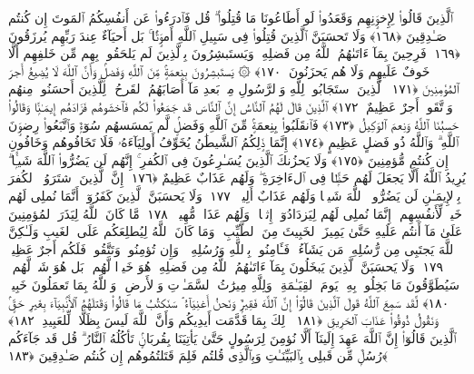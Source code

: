  ٱلَّذِينَ قَالُوا۟ لِإِخوَٟنِهِم وَقَعَدُوا۟ لَو أَطَاعُونَا مَا قُتِلُوا۟ ۗ قُل فَٱدرَءُوا۟ عَن أَنفُسِكُمُ ٱلمَوتَ إِن كُنتُم صَـٰدِقِينَ ﴿١٦٨﴾
 وَلَا تَحسَبَنَّ ٱلَّذِينَ قُتِلُوا۟ فِى سَبِيلِ ٱللَّهِ أَموَٟتًۢا ۚ بَل أَحيَآءٌ عِندَ رَبِّهِم يُرزَقُونَ ﴿١٦٩﴾
 فَرِحِينَ بِمَآ ءَاتَىٰهُمُ ٱللَّهُ مِن فَضلِهِۦ وَيَستَبشِرُونَ بِٱلَّذِينَ لَم يَلحَقُوا۟ بِهِم مِّن خَلفِهِم أَلَّا خَوفٌ عَلَيهِم وَلَا هُم يَحزَنُونَ ﴿١٧٠﴾
 ۞ يَستَبشِرُونَ بِنِعمَةٍۢ مِّنَ ٱللَّهِ وَفَضلٍۢ وَأَنَّ ٱللَّهَ لَا يُضِيعُ أَجرَ ٱلمُؤمِنِينَ ﴿١٧١﴾
 ٱلَّذِينَ ٱستَجَابُوا۟ لِلَّهِ وَٱلرَّسُولِ مِنۢ بَعدِ مَآ أَصَابَهُمُ ٱلقَرحُ ۚ لِلَّذِينَ أَحسَنُوا۟ مِنهُم وَٱتَّقَوا۟ أَجرٌ عَظِيمٌ ﴿١٧٢﴾
 ٱلَّذِينَ قَالَ لَهُمُ ٱلنَّاسُ إِنَّ ٱلنَّاسَ قَد جَمَعُوا۟ لَكُم فَٱخشَوهُم فَزَادَهُم إِيمَـٰنًۭا وَقَالُوا۟ حَسبُنَا ٱللَّهُ وَنِعمَ ٱلوَكِيلُ ﴿١٧٣﴾
 فَٱنقَلَبُوا۟ بِنِعمَةٍۢ مِّنَ ٱللَّهِ وَفَضلٍۢ لَّم يَمسَسهُم سُوٓءٌۭ وَٱتَّبَعُوا۟ رِضوَٟنَ ٱللَّهِ ۗ وَٱللَّهُ ذُو فَضلٍ عَظِيمٍ ﴿١٧٤﴾
 إِنَّمَا ذَٟلِكُمُ ٱلشَّيطَٰنُ يُخَوِّفُ أَولِيَآءَهُۥ فَلَا تَخَافُوهُم وَخَافُونِ إِن كُنتُم مُّؤمِنِينَ ﴿١٧٥﴾
 وَلَا يَحزُنكَ ٱلَّذِينَ يُسَـٰرِعُونَ فِى ٱلكُفرِ ۚ إِنَّهُم لَن يَضُرُّوا۟ ٱللَّهَ شَيـًۭٔا ۗ يُرِيدُ ٱللَّهُ أَلَّا يَجعَلَ لَهُم حَظًّۭا فِى ٱلءَاخِرَةِ ۖ وَلَهُم عَذَابٌ عَظِيمٌ ﴿١٧٦﴾
 إِنَّ ٱلَّذِينَ ٱشتَرَوُا۟ ٱلكُفرَ بِٱلإِيمَـٰنِ لَن يَضُرُّوا۟ ٱللَّهَ شَيـًۭٔا وَلَهُم عَذَابٌ أَلِيمٌۭ ﴿١٧٧﴾
 وَلَا يَحسَبَنَّ ٱلَّذِينَ كَفَرُوٓا۟ أَنَّمَا نُملِى لَهُم خَيرٌۭ لِّأَنفُسِهِم ۚ إِنَّمَا نُملِى لَهُم لِيَزدَادُوٓا۟ إِثمًۭا ۚ وَلَهُم عَذَابٌۭ مُّهِينٌۭ ﴿١٧٨﴾
 مَّا كَانَ ٱللَّهُ لِيَذَرَ ٱلمُؤمِنِينَ عَلَىٰ مَآ أَنتُم عَلَيهِ حَتَّىٰ يَمِيزَ ٱلخَبِيثَ مِنَ ٱلطَّيِّبِ ۗ وَمَا كَانَ ٱللَّهُ لِيُطلِعَكُم عَلَى ٱلغَيبِ وَلَـٰكِنَّ ٱللَّهَ يَجتَبِى مِن رُّسُلِهِۦ مَن يَشَآءُ ۖ فَـَٔامِنُوا۟ بِٱللَّهِ وَرُسُلِهِۦ ۚ وَإِن تُؤمِنُوا۟ وَتَتَّقُوا۟ فَلَكُم أَجرٌ عَظِيمٌۭ ﴿١٧٩﴾
 وَلَا يَحسَبَنَّ ٱلَّذِينَ يَبخَلُونَ بِمَآ ءَاتَىٰهُمُ ٱللَّهُ مِن فَضلِهِۦ هُوَ خَيرًۭا لَّهُم ۖ بَل هُوَ شَرٌّۭ لَّهُم ۖ سَيُطَوَّقُونَ مَا بَخِلُوا۟ بِهِۦ يَومَ ٱلقِيَـٰمَةِ ۗ وَلِلَّهِ مِيرَٰثُ ٱلسَّمَـٰوَٟتِ وَٱلأَرضِ ۗ وَٱللَّهُ بِمَا تَعمَلُونَ خَبِيرٌۭ ﴿١٨٠﴾
 لَّقَد سَمِعَ ٱللَّهُ قَولَ ٱلَّذِينَ قَالُوٓا۟ إِنَّ ٱللَّهَ فَقِيرٌۭ وَنَحنُ أَغنِيَآءُ ۘ سَنَكتُبُ مَا قَالُوا۟ وَقَتلَهُمُ ٱلأَنۢبِيَآءَ بِغَيرِ حَقٍّۢ وَنَقُولُ ذُوقُوا۟ عَذَابَ ٱلحَرِيقِ ﴿١٨١﴾
 ذَٟلِكَ بِمَا قَدَّمَت أَيدِيكُم وَأَنَّ ٱللَّهَ لَيسَ بِظَلَّامٍۢ لِّلعَبِيدِ ﴿١٨٢﴾
 ٱلَّذِينَ قَالُوٓا۟ إِنَّ ٱللَّهَ عَهِدَ إِلَينَآ أَلَّا نُؤمِنَ لِرَسُولٍ حَتَّىٰ يَأتِيَنَا بِقُربَانٍۢ تَأكُلُهُ ٱلنَّارُ ۗ قُل قَد جَآءَكُم رُسُلٌۭ مِّن قَبلِى بِٱلبَيِّنَـٰتِ وَبِٱلَّذِى قُلتُم فَلِمَ قَتَلتُمُوهُم إِن كُنتُم صَـٰدِقِينَ ﴿١٨٣﴾
